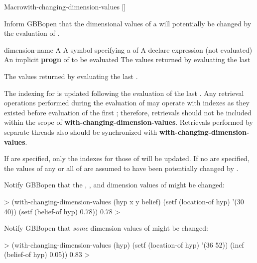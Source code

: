 \documentclass[10pt,twoside,english,pdftex]{article}
\begin{document}
\begin{functiondoc}{Macro}{with-changing-dimension-values}%
  {\code{(} 
         [\superstar{}]\code{)}
    \superstar{}
    \superstar{}
    \returns{} \superstar}
%
  
\fnsyntax

\fnpurpose Inform GBBopen that the dimensional values of a
 will potentially be changed by the evaluation of
.

\fnpackage {}

\fnmodule {}

\fnargs
\begin{args}{dimension-name}
 A 
 A symbol specifying a  of
\arg[declaration] A declare expression (not evaluated)
\arg[forms] An implicit \textbf{progn} of  to be evaluated
\arg[results] The values returned by evaluating the last 
\end{args}

\fnreturns The values returned by evaluating the last .

\fndescription The indexing for  is updated following the
evaluation of the last .  Any retrieval operations performed during
the evaluation of  may operate with indexes as they existed
before evaluation of the first ; therefore, retrievals should not be
included within the scope of \textbf{with-changing-dimension-values}.
Retrievals performed by separate threads also should be synchronized with
\textbf{with-changing-dimension-values}.

If  are specified, only the indexes for those
 of  will be updated. If no
 are specified, the values of any or all
 of  are assumed to have been
potentially changed by .

\fnexamples Notify GBBopen that the , , and 
dimension values of  might be changed:
%
\W\supp
\begin{example}
  > (with-changing-dimension-values (hyp x y belief)
      (setf (location-of hyp) '(30 40))
      (setf (belief-of hyp) 0.78))
  0.78
  >
\end{example}
%
Notify GBBopen that \textit{some\/} dimension values of  might be
changed:
%
\W\supp\notpretop
\begin{example}
  > (with-changing-dimension-values (hyp)
      (setf (location-of hyp) '(36 52))
      (incf (belief-of hyp) 0.05))
  0.83
  >
\end{example}

\end{functiondoc}
\end{document}

